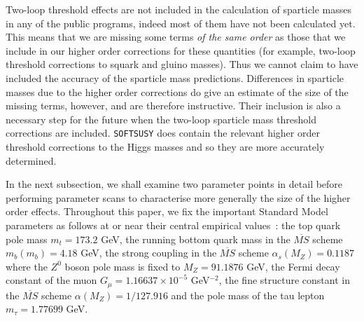 \documentclass[final,3p,times,pdflatex]{elsarticle}
\begin{document}
Two-loop threshold effects
are not included in the calculation of sparticle masses in any of the public
programs, indeed most of them have not been calculated yet. This means that 
we are missing some terms {\em of the same order}\/ as those that we include 
in our higher order corrections for these quantities (for example, two-loop
threshold corrections to squark and gluino masses). Thus we cannot claim to
have included the accuracy of the sparticle mass predictions. 
Differences in
sparticle masses due to the higher order corrections do give an estimate of
the size of the missing terms, however, and are therefore instructive. 
Their inclusion is also a necessary step for the future when the two-loop
sparticle mass threshold corrections are included. 
{\tt SOFTSUSY} does contain the relevant higher order threshold
corrections to the Higgs masses and so they are more accurately determined. 

In the next subsection, we shall examine two parameter points in detail
before performing parameter scans to characterise more generally the size of
the higher order effects.
Throughout this paper, we fix the important Standard Model parameters as
follows at or near their central empirical values~\cite{PhysRevD.86.010001}:
the top  
quark pole mass $m_t=173.2$ 
GeV, the running bottom quark mass in the $\overline{MS}$ scheme
$m_b(m_b)=4.18$ GeV, the strong coupling in the $\overline{MS}$ scheme
$\alpha_s(M_Z)=0.1187$ where the $Z^0$ boson pole mass is fixed to
$M_Z=91.1876$ GeV, the Fermi decay constant of the muon $G_\mu=1.16637
\times 10^{-5}$ GeV$^{-2}$, the fine structure constant in the $\overline{MS}$
scheme $\alpha(M_Z)=1/127.916$ and the pole mass of the tau lepton
$m_\tau=1.77699$ GeV. 
\end{document}
